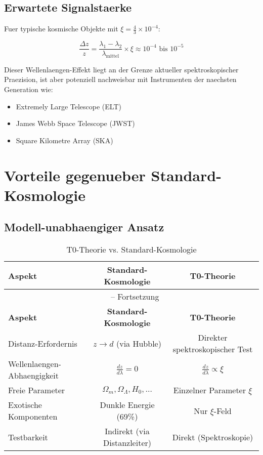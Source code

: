 \documentclass[12pt,a4paper]{article}
\newcommand{\xiconst}{\xi = \frac{4}{3} \times 10^{-4}}
\theoremstyle{definition}
\begin{document}
	\subsection{Erwartete Signalstaerke}
	
	Fuer typische kosmische Objekte mit $\xiconst$:
	
	\begin{equation}
		\frac{\Delta z}{z} = \frac{\lambda_1 - \lambda_2}{\lambda_{\text{mittel}}} \times \xi \approx 10^{-4} \text{ bis } 10^{-5}
	\end{equation}
	
	\begin{wichtig}
		Dieser Wellenlaengen-Effekt liegt an der Grenze aktueller spektroskopischer Praezision, ist aber potenziell nachweisbar mit Instrumenten der naechsten Generation wie:
		\begin{itemize}
			\item Extremely Large Telescope (ELT)
			\item James Webb Space Telescope (JWST)
			\item Square Kilometre Array (SKA)
		\end{itemize}
	\end{wichtig}
	
	\section{Vorteile gegenueber Standard-Kosmologie}
	
	\subsection{Modell-unabhaengiger Ansatz}
	
	\begin{longtable}{lcc}
		\caption{T0-Theorie vs. Standard-Kosmologie} \\
		\toprule
		\textbf{Aspekt} & \textbf{Standard-Kosmologie} & \textbf{T0-Theorie} \\
		\midrule
		\endfirsthead
		\multicolumn{3}{c}{\tablename\ \thetable{} -- Fortsetzung} \\
		\toprule
		\textbf{Aspekt} & \textbf{Standard-Kosmologie} & \textbf{T0-Theorie} \\
		\midrule
		\endhead
		Distanz-Erfordernis & $z \rightarrow d$ (via Hubble) & Direkter spektroskopischer Test \\
		Wellenlaengen-Abhaengigkeit & $\frac{dz}{d\lambda} = 0$ & $\frac{dz}{d\lambda} \propto \xi$ \\
		Freie Parameter & $\Omega_m, \Omega_\Lambda, H_0, \ldots$ & Einzelner Parameter $\xi$ \\
		Exotische Komponenten & Dunkle Energie (69\%) & Nur $\xi$-Feld \\
		Testbarkeit & Indirekt (via Distanzleiter) & Direkt (Spektroskopie) \\
		\bottomrule
	\end{longtable}
	
\end{document}
